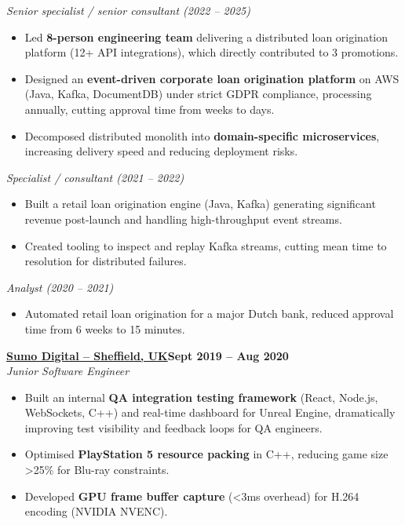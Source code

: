 \documentclass[11pt]{article}       %
\begin{document}
\textit{Senior specialist / senior consultant (2022 -- 2025)} \\
\vspace{-9pt}
\begin{itemize}
  \item Led \textbf{8-person engineering team} delivering a distributed loan origination platform (12+ API integrations), which directly contributed to 3 promotions.
  \item Designed an \textbf{event-driven corporate loan origination platform} on AWS (Java, Kafka, DocumentDB) under strict GDPR compliance, processing  annually, cutting approval time from weeks to days.
  \item Decomposed distributed monolith into \textbf{domain-specific microservices}, increasing delivery speed and reducing deployment risks.
\end{itemize}

\textit{Specialist / consultant (2021 -- 2022)} \\
\vspace{-9pt}
\begin{itemize}
  \item Built a retail loan origination engine (Java, Kafka) generating significant revenue post-launch and handling high-throughput event streams.
  \item Created tooling to inspect and replay Kafka streams, cutting mean time to resolution for distributed failures.
\end{itemize}

\textit{Analyst (2020 -- 2021)} \\
\vspace{-9pt}
\begin{itemize}
  \item Automated retail loan origination for a major Dutch bank, reduced approval time from 6 weeks to 15 minutes.
\end{itemize}

\textbf{\href{https://www.sumo-digital.com/}{Sumo Digital -- Sheffield, UK}\hfill Sept 2019 -- Aug 2020} \\
\textit{Junior Software Engineer}
\begin{itemize}
  \item Built an internal \textbf{QA integration testing framework} (React, Node.js, WebSockets, C++) and real-time dashboard for Unreal Engine, dramatically improving test visibility and feedback loops for QA engineers.
  \item Optimised \textbf{PlayStation 5 resource packing} in C++, reducing game size \textgreater25\% for Blu-ray constraints.
  \item Developed \textbf{GPU frame buffer capture} (\textless3ms overhead) for H.264 encoding (NVIDIA NVENC).
\end{itemize}
\end{document}
